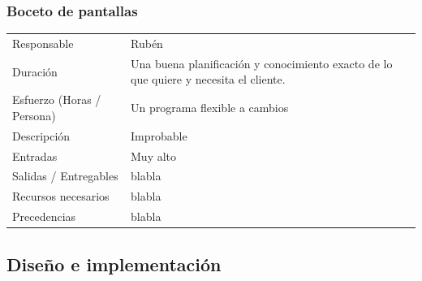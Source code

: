 \subsubsection{Boceto de pantallas}
\begin{table}[H]
    \begin{center}
        \begin{tabular}{l p{8cm}}
            Responsable                           & Rub\'{e}n \\
            Duraci\'{o}n                          & Una buena planificación y conocimiento exacto de lo que quiere y necesita el cliente. \\ 
            Esfuerzo (Horas / Persona)            & Un programa flexible a cambios \\
            Descripci\'{o}n                       & Improbable \\
            Entradas                              & Muy alto\\
            Salidas / Entregables                 & blabla \\
            Recursos necesarios                   & blabla \\
            Precedencias                          & blabla \\
        \end{tabular}
    \end{center}
    
\end{table}

\subsection{Dise\~{n}o e implementaci\'{o}n}
